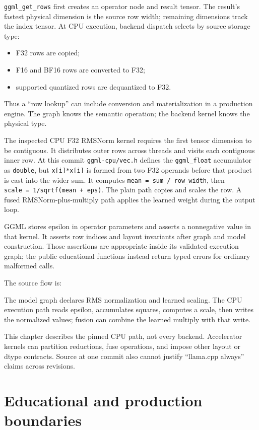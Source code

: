 \texttt{ggml\_get\_rows} first creates an operator node and result
tensor. The result's fastest physical dimension is the source row width;
remaining dimensions track the index tensor. At CPU execution, backend
dispatch selects by source storage type:

\begin{itemize}
\tightlist
\item
  F32 rows are copied;
\item
  F16 and BF16 rows are converted to F32;
\item
  supported quantized rows are dequantized to F32.
\end{itemize}

Thus a ``row lookup'' can include conversion and materialization in a
production engine. The graph knows the semantic operation; the backend
kernel knows the physical type.

The inspected CPU F32 RMSNorm kernel requires the first tensor dimension
to be contiguous. It distributes outer rows across threads and visits
each contiguous inner row. At this commit \texttt{ggml-cpu/vec.h}
defines the \texttt{ggml\_float} accumulator as \texttt{double}, but
\texttt{x{[}i{]}*x{[}i{]}} is formed from two F32 operands before that
product is cast into the wider sum. It computes
\texttt{mean\ =\ sum\ /\ row\_width}, then
\texttt{scale\ =\ 1/sqrtf(mean\ +\ eps)}. The plain path copies and
scales the row. A fused RMSNorm-plus-multiply path applies the learned
weight during the output loop.

GGML stores epsilon in operator parameters and asserts a nonnegative
value in that kernel. It asserts row indices and layout invariants after
graph and model construction. Those assertions are appropriate inside
its validated execution graph; the public educational functions instead
return typed errors for ordinary malformed calls.

The source flow is:

The model graph declares RMS normalization and learned scaling. The CPU execution path reads epsilon, accumulates squares, computes a scale, then writes the normalized values; fusion can combine the learned multiply with that write.

This chapter describes the pinned CPU path, not every backend.
Accelerator kernels can partition reductions, fuse operations, and
impose other layout or dtype contracts. Source at one commit also cannot
justify ``llama.cpp always'' claims across revisions.

\section{Educational and production
boundaries}\label{educational-and-production-boundaries}

